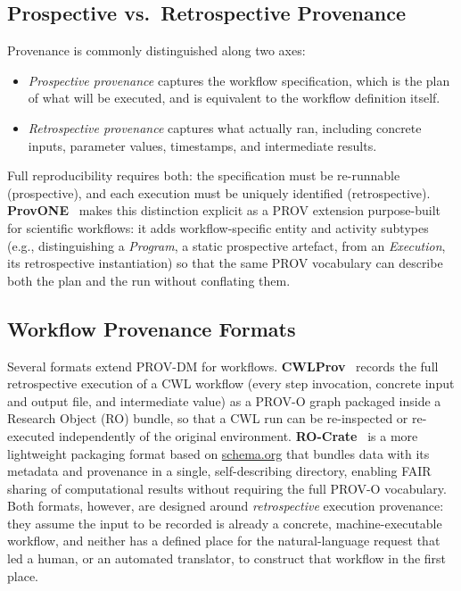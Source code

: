 \subsection{Prospective vs.\ Retrospective Provenance}

Provenance is commonly distinguished along two axes: 
\begin{itemize}
    \item \emph{Prospective provenance} captures the workflow specification, which is the plan of what will be
executed, and is equivalent to the workflow definition itself.
    \item \emph{Retrospective provenance} captures what actually ran, including concrete
inputs, parameter values, timestamps, and intermediate results.
\end{itemize}
Full reproducibility requires both: the specification must be re-runnable
(prospective), and each execution must be uniquely identified (retrospective).
\textbf{ProvONE}~\cite{cuevasvicentin2016provone} makes this distinction
explicit as a PROV extension purpose-built for scientific workflows: it adds
workflow-specific entity and activity subtypes (e.g., distinguishing a
\emph{Program}, a static prospective artefact, from an \emph{Execution}, its
retrospective instantiation) so that the same PROV vocabulary can describe
both the plan and the run without conflating them.

\subsection{Workflow Provenance Formats}

Several formats extend PROV-DM for workflows.
\textbf{CWLProv}~\cite{soiland2018cwlprov} records the full retrospective
execution of a CWL workflow (every step invocation, concrete input and
output file, and intermediate value) as a PROV-O graph packaged inside a
Research Object (RO) bundle, so that a CWL run can be re-inspected or
re-executed independently of the original environment.
\textbf{RO-Crate}~\cite{soiland2022rocrate} is a more lightweight packaging
format based on \href{https://schema.org}{schema.org} that bundles data with its metadata and
provenance in a single, self-describing directory, enabling FAIR sharing of
computational results without requiring the full PROV-O vocabulary. Both
formats, however, are designed around \emph{retrospective} execution
provenance: they assume the input to be recorded is already a concrete,
machine-executable workflow, and neither has a defined place for the
natural-language request that led a human, or an automated translator, to
construct that workflow in the first place.

